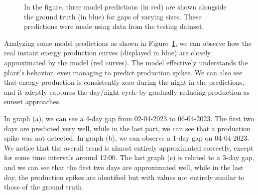 \begin{figure}[H]
\begin{subfigure}{\textwidth}
		\caption{}
	\end{subfigure}
	\caption{In the figure, three model predictions (in red) are shown alongside the ground truth (in blue) for gaps of varying sizes. These predictions were made using data from the testing dataset.}
	\label{fig:grrunevalplots}
\end{figure}

Analyzing some model predictions as shown in
Figure~\ref{fig:grrunevalplots}, we can observe how the real
instant energy production curves (displayed in blue) are
closely approximated by the model (red curves).
The model effectively understands the plant's behavior,
even managing to predict production spikes.
We can also see that energy production is consistently zero during
the night in the predictions, and it adeptly captures the
day/night cycle by gradually reducing production as sunset approaches.

In graph (a), we can see a 4-day gap from 02-04-2023 to 06-04-2023.
The first two days are predicted very well, while in the last part,
we can see that a production spike was not detected.
In graph (b), we can observe a 1-day gap on 04-04-2023. We notice that the overall trend is almost entirely approximated correctly, except for some time intervals around 12:00.
The last graph (c) is related to a 3-day gap, and we can see that the first two days are approximated well, while in the last day, the production spikes are identified but with values not entirely similar to those of the ground truth.


